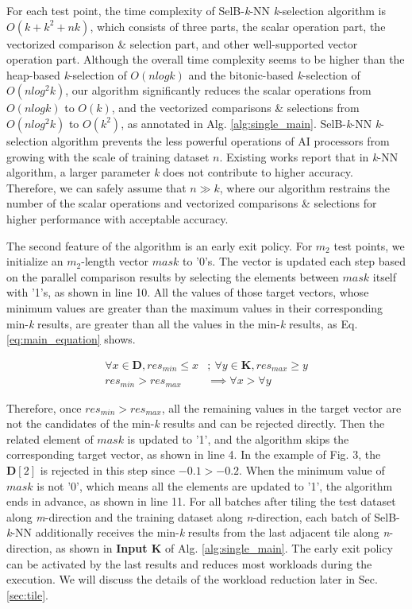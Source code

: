 \documentclass[12pt]{extbook}
\begin{document}
For each test point, the time complexity of SelB-\textit{k}-NN \textit{k}-selection algorithm is $O(k + k^2 + nk)$, which consists of three parts, the scalar operation part, the vectorized comparison \& selection part, and other well-supported vector operation part. Although the overall time complexity seems to be higher than the heap-based \textit{k}-selection of $O(nlogk)$ and the bitonic-based \textit{k}-selection of $O(nlog^2k)$, our algorithm significantly reduces the scalar operations from $O(nlogk)$ to $O(k)$, and the vectorized comparisons \& selections from $O(nlog^2k)$ to $O(k^2)$, as annotated in Alg. \ref{alg:single_main}. SelB-\textit{k}-NN \textit{k}-selection algorithm prevents the less powerful operations of AI processors from growing with the scale of training dataset $n$. Existing works \cite{hassanat2014solving, abu2019effects} report that in \textit{k}-NN algorithm, a larger parameter \textit{k} does not contribute to higher accuracy. Therefore, we can safely assume that $n \gg k$, where our algorithm restrains the number of the scalar operations and vectorized comparisons \& selections for higher performance with acceptable accuracy.

The second feature of the algorithm is an early exit policy. For $m_2$ test points, we initialize an $m_2$-length vector $mask$ to '0's. The vector is updated each step based on the parallel comparison results by selecting the elements between $mask$ itself with '1's, as shown in line 10. All the values of those target vectors, whose minimum values are greater than the maximum values in their corresponding min-\textit{k} results, are greater than all the values in the min-\textit{k} results, as Eq. \ref{eq:main_equation} shows. 

\begin{equation}
    \label{eq:main_equation}
    \begin{aligned}
    \forall x \in \textbf{D}, res_{min} \le x &;\ 
        \forall y \in \textbf{K}, res_{max} \ge y \\
    res_{min} > res_{max} &\implies \forall x > \forall y
    \end{aligned}
\end{equation}

Therefore, once $res_{min} > res_{max}$, all the remaining values in the target vector are not the candidates of the min-\textit{k} results and can be rejected directly. Then the related element of $mask$ is updated to '1', and the algorithm skips the corresponding target vector, as shown in line 4. In the example of Fig. 3, the $\textbf{D}[2]$ is rejected in this step since $-0.1 > -0.2$. When the minimum value of $mask$ is not '0', which means all the elements are updated to '1', the algorithm ends in advance, as shown in line 11. For all batches after tiling the test dataset along \textit{m}-direction and the training dataset along \textit{n}-direction, each batch of SelB-\textit{k}-NN additionally receives the min-\textit{k} results from the last adjacent tile along \textit{n}-direction, as shown in \textbf{Input K} of Alg. \ref{alg:single_main}. The early exit policy can be activated by the last results and reduces most workloads during the execution. We will discuss the details of the workload reduction later in Sec. \ref{sec:tile}.
\end{document}
